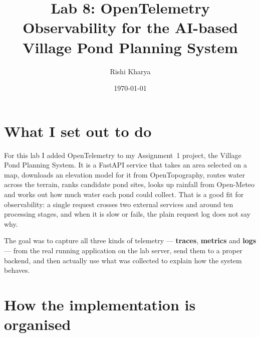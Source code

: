 \documentclass[11pt]{article}
\title{\vspace{-1.2em}\textbf{Lab 8: OpenTelemetry}\\[0.2em]
\large Observability for the AI-based Village Pond Planning System}
\author{Rishi Kharya}
\date{\today}
\begin{document}
\maketitle
\vspace{-1em}

\begin{center}
\end{center}

\section{What I set out to do}

For this lab I added OpenTelemetry to my Assignment~1 project, the Village Pond
Planning System. It is a FastAPI service that takes an area selected on a map,
downloads an elevation model for it from OpenTopography, routes water across the
terrain, ranks candidate pond sites, looks up rainfall from Open-Meteo and works out
how much water each pond could collect. That is a good fit for observability: a
single request crosses two external services and around ten processing stages,
and when it is slow or fails, the plain request log does not say why.

The goal was to capture all three kinds of telemetry --- \textbf{traces},
\textbf{metrics} and \textbf{logs} --- from the real running application on the lab
server, send them to a proper backend, and then actually use what was collected to
explain how the system behaves.

\section{How the implementation is organised}
\end{document}
